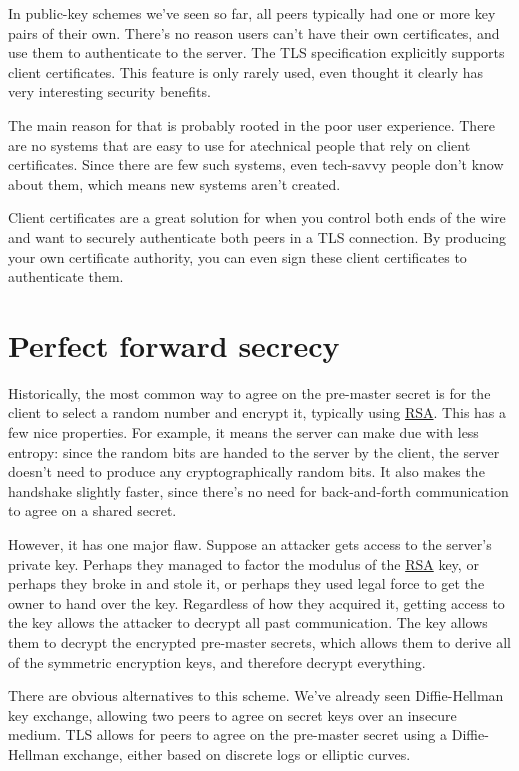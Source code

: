 \documentclass[11pt,ebook,table,dvipsnames]{memoir}
\begin{document}
In public-key schemes we've seen so far, all peers typically had one
or more key pairs of their own. There's no reason users can't have
their own certificates, and use them to authenticate to the server.
The TLS specification explicitly supports client certificates. This
feature is only rarely used, even thought it clearly has very
interesting security benefits.

The main reason for that is probably rooted in the poor user
experience. There are no systems that are easy to use for atechnical
people that rely on client certificates. Since there are few such
systems, even tech-savvy people don't know about them, which means
new systems aren't created.

Client certificates are a great solution for when you control both
ends of the wire and want to securely authenticate both peers in a
TLS connection. By producing your own certificate authority, you can
even sign these client certificates to authenticate them.
\section{Perfect forward secrecy}
\label{sec-3-1-6}

Historically, the most common way to agree on the pre-master secret is
for the client to select a random number and encrypt it, typically
using \hyperref[RSA]{RSA}. This has a few nice properties. For example, it means the
server can make due with less entropy: since the random bits are
handed to the server by the client, the server doesn't need to produce
any cryptographically random bits. It also makes the handshake
slightly faster, since there's no need for back-and-forth
communication to agree on a shared secret.

However, it has one major flaw. Suppose an attacker gets access to the
server's private key. Perhaps they managed to factor the modulus of
the \hyperref[RSA]{RSA} key, or perhaps they broke in and stole it, or perhaps they
used legal force to get the owner to hand over the key. Regardless of
how they acquired it, getting access to the key allows the attacker to
decrypt all past communication. The key allows them to decrypt the
encrypted pre-master secrets, which allows them to derive all of the
symmetric encryption keys, and therefore decrypt everything.

There are obvious alternatives to this scheme. We've already seen
Diffie-Hellman key exchange, allowing two peers to agree on secret
keys over an insecure medium. TLS allows for peers to agree on the
pre-master secret using a Diffie-Hellman exchange, either based on
discrete logs or elliptic curves.
\end{document}
